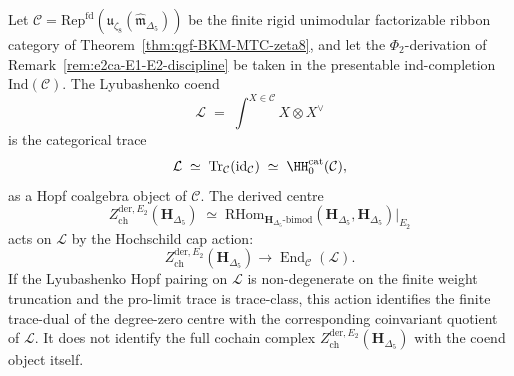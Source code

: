 \begin{theorem}
\label{thm:e2ca-coend-equals-derived-centre}
Let
$\mathcal C=\mathrm{Rep}^{\mathrm{fd}}(\mathfrak u_{\zeta_8}
(\widehat{\mathfrak m}_{\Delta_5}))$ be the finite rigid unimodular
factorizable ribbon category of
Theorem~\ref{thm:qgf-BKM-MTC-zeta8}, and let the $\Phi_2$-derivation of
Remark~\ref{rem:e2ca-E1-E2-discipline} be taken in the presentable
ind-completion $\mathrm{Ind}(\mathcal C)$. The Lyubashenko coend
\[
 \mathcal L
 \;=\;
 \int^{X\in\mathcal C}
 X\otimes X^\vee
\]
is the categorical trace
\[
 \mathcal L \;\simeq\; \mathrm{Tr}_{\mathcal C}(\mathrm{id}_{\mathcal C})
 \;\simeq\; \HH^{\mathrm{cat}}_0(\mathcal C),
\]
as a Hopf coalgebra object of $\mathcal C$. The derived centre
\[
 Z^{\mathrm{der}, E_2}_{\mathrm{ch}}(\mathbf H_{\Delta_5})
 \;\simeq\;
 \mathrm{RHom}_{\mathbf H_{\Delta_5}\text{-bimod}}
 (\mathbf H_{\Delta_5},\mathbf H_{\Delta_5})\big|_{E_2}
\]
acts on $\mathcal L$ by the Hochschild cap action:
\[
 Z^{\mathrm{der}, E_2}_{\mathrm{ch}}(\mathbf H_{\Delta_5})
 \longrightarrow
 \operatorname{End}_{\mathcal C}(\mathcal L).
\]
If the Lyubashenko Hopf pairing on $\mathcal L$ is non-degenerate on
the finite weight truncation and the pro-limit trace is trace-class,
this action identifies the finite trace-dual of the degree-zero centre
with the corresponding coinvariant quotient of $\mathcal L$. It does
not identify the full cochain complex
$Z^{\mathrm{der}, E_2}_{\mathrm{ch}}(\mathbf H_{\Delta_5})$ with the
coend object itself.
\end{theorem}

